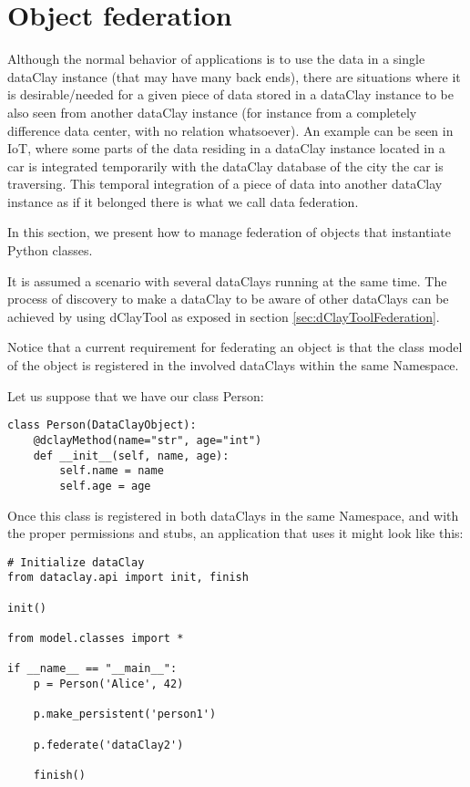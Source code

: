 \section{Object federation}
\label{sec:pFederation}

Although the normal behavior of applications is to use the data in a single dataClay instance (that may have many back ends), there are situations where it is desirable/needed for a given piece of data stored in a dataClay instance to be also seen from another dataClay instance (for instance from a completely difference data center, with no relation whatsoever). An example can be seen in IoT, where some parts of the data residing in a dataClay instance located in a car is integrated temporarily with the dataClay database of the city the car is traversing. This temporal integration of a piece of data into another dataClay instance as if it belonged there is what we call data federation.

In this section, we present how to manage federation of objects that instantiate Python classes. 

It is assumed a scenario with several dataClays running at the same time. The process 
of discovery to make a dataClay to be aware of other dataClays can be achieved by using dClayTool as 
exposed in section \ref{sec:dClayToolFederation}.

Notice that a current requirement for federating an object is that the class model of the object is registered in the involved 
dataClays within the same Namespace.

Let us suppose that we have our class Person:

\begin{tBox}
\begin{lstlisting}
class Person(DataClayObject):
    @dclayMethod(name="str", age="int")
    def __init__(self, name, age):
        self.name = name
        self.age = age
\end{lstlisting}
\end{tBox}

Once this class is registered in both dataClays in the same Namespace, and with the proper permissions and stubs, 
an application that uses it might look like this:

\begin{tBox}
\begin{lstlisting}
# Initialize dataClay
from dataclay.api import init, finish

init()

from model.classes import *

if __name__ == "__main__":
    p = Person('Alice', 42)

    p.make_persistent('person1')

    p.federate('dataClay2')
    
    finish()
\end{lstlisting}
\end{tBox}

